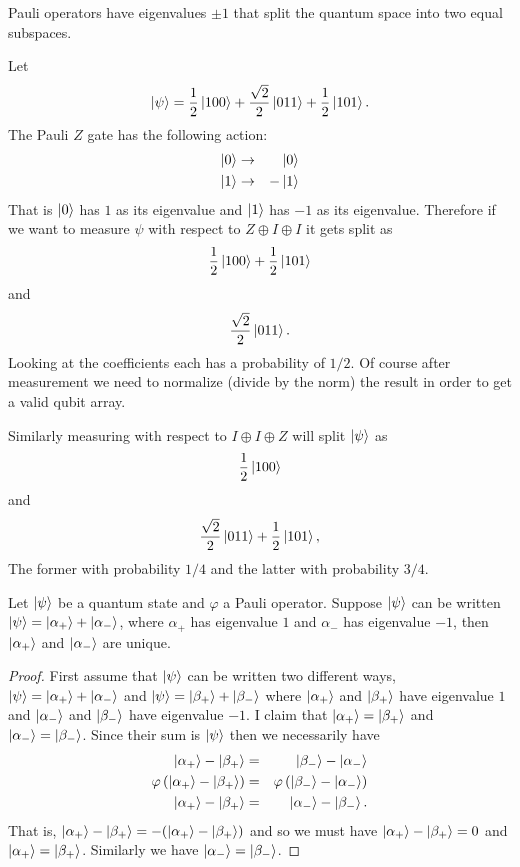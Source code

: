 \documentclass{article}
\begin{document}
\begin{fact}
  Pauli operators have eigenvalues $\pm1$ that split the
  quantum space into two equal subspaces.
\end{fact}

\begin{example}
  Let 
  \[
    \ket\psi= \frac{1}{2}\ket{100} 
      +\frac{\sqrt{2}}{2}\ket{011}
      +\frac{1}{2}\ket{101}.
  \]
  The Pauli $Z$ gate has the following action:
  \begin{eqnarray*}
    \ket{0}&\rightarrow&\ket{0}\\
    \ket{1}&\rightarrow&-\ket{1}
  \end{eqnarray*}
  That is $\ket0$ has $1$ as its eigenvalue and $\ket1$ has
  $-1$ as its eigenvalue. Therefore if we want to measure
  $\psi$ with respect to $Z\oplus I\oplus I$ it gets split as
  \[
    \frac{1}{2}\ket{100} 
      +\frac{1}{2}\ket{101}
  \]
  and
  \[
    \frac{\sqrt{2}}{2}\ket{011}.
  \]
  Looking at the coefficients each has a probability of $1/2$.
  Of course after measurement we need to normalize 
  (divide by the norm) the result in order to get a valid
  qubit array.

  Similarly measuring with respect to $I\oplus I\oplus Z$ will
  split $\ket\psi$ as
  \[
    \frac{1}{2}\ket{100}
  \]
  and
  \[
    \frac{\sqrt{2}}{2}\ket{011}
  +\frac{1}{2}\ket{101},
  \]
  The former with probability $1/4$ and the latter with probability
  $3/4$.
\end{example}

\begin{lemma}
  Let $\ket{\psi}$ be a quantum state and $\varphi$ a Pauli operator. 
  Suppose $\ket{\psi}$ can be written $\ket\psi=\ket{\alpha_+}+\ket{\alpha_-}$,
  where $\alpha_+$ has eigenvalue $1$ and $\alpha_-$ has eigenvalue $-1$,
  then $\ket{\alpha_+}$ and $\ket{\alpha_-}$ are unique.
  \begin{proof}
    First assume that
    $\ket\psi$ can be written two different ways,
    $\ket\psi=\ket{\alpha_{+}}+\ket{\alpha_{-}}$ and 
    $\ket\psi=\ket{\beta_+}+\ket{\beta_{-}}$ where
    $\ket{\alpha_+}$ and $\ket{\beta_+}$ have eigenvalue $1$ and
    $\ket{\alpha_{-}}$ and $\ket{\beta_{-}}$ have eigenvalue $-1$.
    I claim that $\ket{\alpha_+}=\ket{\beta_+}$ and 
    $\ket{\alpha_-}=\ket{\beta_-}$.
    Since their sum is $\ket\psi$ then we necessarily have
    \begin{eqnarray*}
      \ket{\alpha_+}-\ket{\beta_+}&=&\ket{\beta_-}-\ket{\alpha_-}\\
      \varphi\left(\ket{\alpha_+}-\ket{\beta_+}\right)&=&\varphi\left(\ket{\beta_-}-\ket{\alpha_-}\right)\\
      \ket{\alpha_+}-\ket{\beta_+}&=&\ket{\alpha_-}-\ket{\beta_-}.
    \end{eqnarray*}
    That is, $\ket{\alpha_+}-\ket{\beta_+}=-(\ket{\alpha_+}-\ket{\beta_+})$ and
    so we must have $\ket{\alpha_+}-\ket{\beta_+}=0$ and $\ket{\alpha_+}=\ket{\beta_+}$.
    Similarly we have $\ket{\alpha_-}=\ket{\beta_-}$.
  \end{proof}
\end{lemma}
\end{document}
